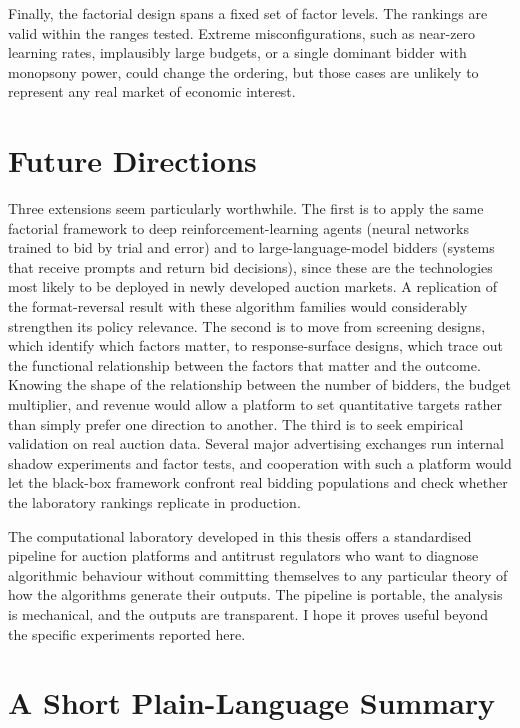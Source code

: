Finally, the factorial design spans a fixed set of factor levels. The rankings are valid within the ranges tested. Extreme misconfigurations, such as near-zero learning rates, implausibly large budgets, or a single dominant bidder with monopsony power, could change the ordering, but those cases are unlikely to represent any real market of economic interest.

\section{Future Directions}
\label{sec:future}

Three extensions seem particularly worthwhile. The first is to apply the same factorial framework to deep reinforcement-learning agents (neural networks trained to bid by trial and error) and to large-language-model bidders (systems that receive prompts and return bid decisions), since these are the technologies most likely to be deployed in newly developed auction markets. A replication of the format-reversal result with these algorithm families would considerably strengthen its policy relevance. The second is to move from screening designs, which identify which factors matter, to response-surface designs, which trace out the functional relationship between the factors that matter and the outcome. Knowing the shape of the relationship between the number of bidders, the budget multiplier, and revenue would allow a platform to set quantitative targets rather than simply prefer one direction to another. The third is to seek empirical validation on real auction data. Several major advertising exchanges run internal shadow experiments and factor tests, and cooperation with such a platform would let the black-box framework confront real bidding populations and check whether the laboratory rankings replicate in production.

The computational laboratory developed in this thesis offers a standardised pipeline for auction platforms and antitrust regulators who want to diagnose algorithmic behaviour without committing themselves to any particular theory of how the algorithms generate their outputs. The pipeline is portable, the analysis is mechanical, and the outputs are transparent. I hope it proves useful beyond the specific experiments reported here.

\section{A Short Plain-Language Summary}
\label{sec:plain_summary}

